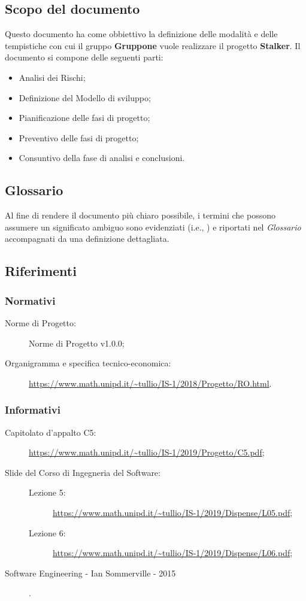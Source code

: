\documentclass[../piano-di-progetto.tex]{subfiles}
\begin{document}
\subsection{Scopo del documento}%
\label{sub:scopo_del_documento}
Questo documento ha come obbiettivo la definizione delle modalità e delle tempistiche con cui il gruppo \textbf{Gruppone} vuole realizzare il progetto \textbf{Stalker}.
Il documento si compone delle seguenti parti:
\begin{itemize}
  \item Analisi dei Rischi;
  \item Definizione del Modello di sviluppo;
  \item Pianificazione delle fasi di progetto;
  \item Preventivo delle fasi di progetto;
  \item Consuntivo della fase di analisi e conclusioni.
\end{itemize}
\subsection{Glossario}%
\label{sub:glossario}
Al fine di rendere il documento più chiaro possibile, i termini che possono assumere un significato ambiguo sono evidenziati (i.e., ) e riportati nel \textit{Glossario} accompagnati da una definizione dettagliata.
\subsection{Riferimenti}%
\label{sub:riferimenti}
\subsubsection{Normativi}%
\label{subs:normativi}
\begin{description}
  \item[Norme di Progetto:] Norme di Progetto v1.0.0;
  \item[Organigramma e specifica tecnico-economica:] \url{https://www.math.unipd.it/~tullio/IS-1/2018/Progetto/RO.html}.
\end{description}
\subsubsection{Informativi}%
\label{subs:informativi}
\begin{description}
  \item[Capitolato d'appalto C5:] \url{https://www.math.unipd.it/~tullio/IS-1/2019/Progetto/C5.pdf};
  \item[Slide del Corso di Ingegneria del Software:]
  \begin{description}
        \item[Lezione 5:] \url{https://www.math.unipd.it/~tullio/IS-1/2019/Dispense/L05.pdf};
        \item[Lezione 6:] \url{https://www.math.unipd.it/~tullio/IS-1/2019/Dispense/L06.pdf};
  \end{description}
  \item[Software Engineering - Ian Sommerville - 2015].
\end{description}%
\end{document}
